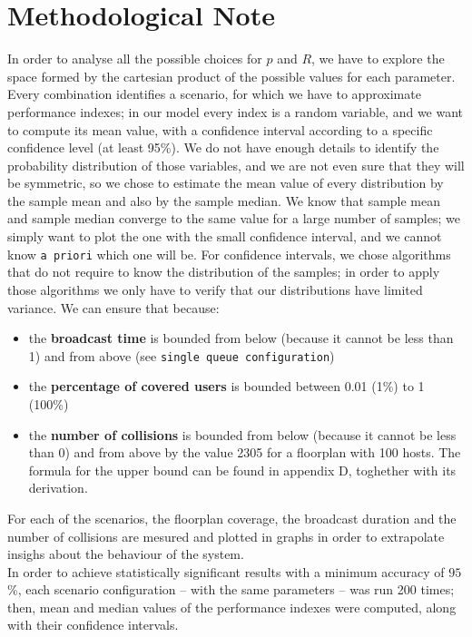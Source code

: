 \section*{Methodological Note}\label{Methodological}
In order to analyse all the possible choices for $p$ and $R$, we have to explore the space
formed by the cartesian product of the possible values for each parameter. Every combination 
identifies a scenario, for which we have to approximate performance indexes; in our model
every index is a random variable, and we want to compute its mean value, with a confidence interval
according to a specific confidence level (at least 95\%). 
We do not have enough details to identify the probability distribution of those variables, and 
we are not even sure that they will be symmetric, so we chose to estimate the mean value of every 
distribution by the sample mean and also by the sample median.
We know that sample mean and sample median converge to the same value for a large number
of samples; we simply want to plot the one with the small confidence interval, and we cannot know
\texttt{a priori} which one will be.
For confidence intervals, we chose algorithms that do not require to know the distribution of the
samples; in order to apply those algorithms we only have to verify that our distributions have
limited variance. We can ensure that because:
\begin{itemize}
    \item the \textbf{broadcast time} is bounded from below (because it cannot be less than 1) and from above
        (see \texttt{single queue configuration})
    \item the \textbf{percentage of covered users} is bounded between 0.01 (1\%) to 1 (100\%)
    \item the \textbf{number of collisions} is bounded from below (because it cannot be less than 0) and
        from above by the value 2305 for a floorplan with 100 hosts. The formula for the upper bound can be found in appendix D, toghether with its derivation.
\end{itemize} 

For each of the scenarios, the floorplan coverage, the
broadcast duration and the number of collisions are mesured and plotted in graphs in order to 
extrapolate insighs about the behaviour of the system.\\
In order to achieve statistically significant results with a minimum accuracy of
$95$\%, each scenario configuration -- with the same parameters -- was run 200 times; then, mean and median values of the performance
indexes were computed, along with their confidence intervals.
